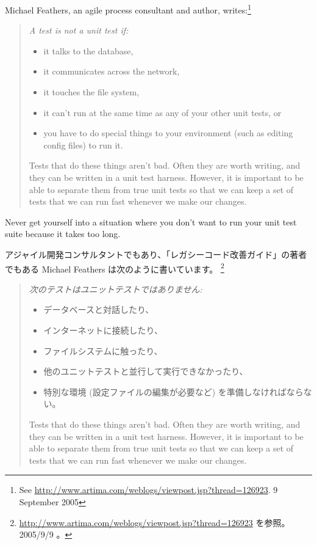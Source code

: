 \documentclass[a4paper,10pt,twoside]{book}
\begin{document}
{\begin{description}
\item[Feathers' Rules for Unit tests.]
  Michael Feathers, an  agile process consultant and author, writes:\footnote{See \url{http://www.artima.com/weblogs/viewpost.jsp?thread=126923}. 9 September 2005} 
  \begin{quotation}
  \noindent
  {\it
  A test is not a unit test if:
  \begin{itemize}
	\item it talks to the database,
	\item it communicates across the network,
	\item it touches the file system,
	\item it can't run at the same time as any of your other unit tests, or
	\item you have to do special things to your environment (such as editing config files) to run it.
 \end{itemize}
Tests that do these things aren't bad. Often they are worth writing, and they can be written in a unit test harness. However, it is important to be able to separate them from true unit tests so that we can keep a set of tests that we can run fast whenever we make our changes.
 }
  \end{quotation}
Never get yourself into a situation where you don't want to run your unit test suite because it takes too long.   
\fi

\item[Feathers のユニットテストの法則。]
  アジャイル開発コンサルタントでもあり、「レガシーコード改善ガイド」の著者でもある Michael Feathers は次のように書いています。 \footnote{\url{http://www.artima.com/weblogs/viewpost.jsp?thread=126923} を参照。 2005/9/9 。}
  \begin{quotation}
  \noindent
  {\it
  次のテストはユニットテストではありません:
  \begin{itemize}
	\item データベースと対話したり、
	\item インターネットに接続したり、
	\item ファイルシステムに触ったり、
	\item 他のユニットテストと並行して実行できなかったり、
	\item 特別な環境 (設定ファイルの編集が必要など) を準備しなければならない。
 \end{itemize}
Tests that do these things aren't bad. Often they are worth writing, and they can be written in a unit test harness. However, it is important to be able to separate them from true unit tests so that we can keep a set of tests that we can run fast whenever we make our changes.
\fi

}
\end{quotation}
\end{description}}
\end{document}
